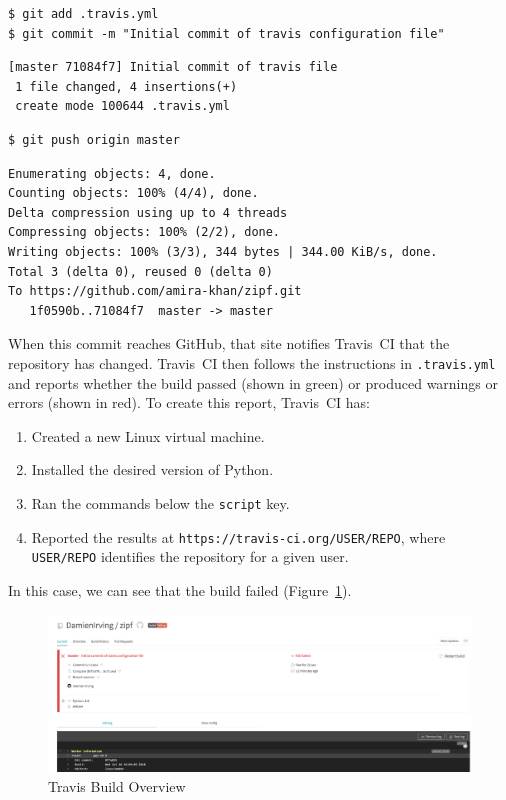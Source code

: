 \documentclass[
]{krantz}
\providecommand{\tightlist}{%
  \setlength{\itemsep}{0pt}\setlength{\parskip}{0pt}}
\begin{document}
\begin{verbatim}
$ git add .travis.yml 
$ git commit -m "Initial commit of travis configuration file"
\end{verbatim}

\begin{verbatim}
[master 71084f7] Initial commit of travis file
 1 file changed, 4 insertions(+)
 create mode 100644 .travis.yml
\end{verbatim}

\begin{verbatim}
$ git push origin master
\end{verbatim}

\begin{verbatim}
Enumerating objects: 4, done.
Counting objects: 100% (4/4), done.
Delta compression using up to 4 threads
Compressing objects: 100% (2/2), done.
Writing objects: 100% (3/3), 344 bytes | 344.00 KiB/s, done.
Total 3 (delta 0), reused 0 (delta 0)
To https://github.com/amira-khan/zipf.git
   1f0590b..71084f7  master -> master
\end{verbatim}

When this commit reaches GitHub,
that site notifies Travis~CI that the repository has changed.
Travis~CI then follows the instructions in \texttt{.travis.yml}
and reports whether the build passed (shown in green)
or produced warnings or errors (shown in red).
To create this report, Travis~CI has:

\begin{enumerate}
\def\labelenumi{\arabic{enumi}.}
\tightlist
\item
  Created a new Linux virtual machine.
\item
  Installed the desired version of Python.
\item
  Ran the commands below the \texttt{script} key.
\item
  Reported the results at \texttt{https://travis-ci.org/USER/REPO},
  where \texttt{USER/REPO}
  identifies the repository for a given user.
\end{enumerate}

In this case,
we can see that the build failed (Figure~\ref{fig:testing-build-fail}).

\begin{figure}

{\centering \includegraphics[width=1\linewidth]{figures/testing/travis-build-fail} 

}

\caption{Travis Build Overview}\label{fig:testing-build-fail}
\end{figure}
\end{document}
